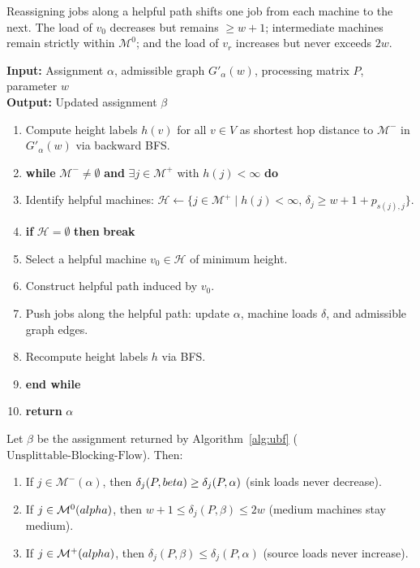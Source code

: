\documentclass{article}
\begin{document}
Reassigning jobs along a helpful path shifts one job from each machine to the next. The load of $v_0$ decreases but remains $\ge w+1$; intermediate machines remain strictly within $\mathcal{M}^0$; and the load of $v_r$ increases but never exceeds $2w$.

\begin{algorithm}[t]
\caption{Unsplittable-Blocking-Flow$(\alpha, G'_\alpha(w), P, w)$}
\label{alg:ubf}
\small
\textbf{Input:} Assignment $\alpha$, admissible graph $G'_\alpha(w)$, processing matrix $P$, parameter $w$\\
\textbf{Output:} Updated assignment $\beta$
\begin{enumerate}\setlength{\itemsep}{1pt}\setlength{\parskip}{0pt}
    \item Compute height labels $h(v)$ for all $v \in V$ as shortest hop distance to $\mathcal{M}^-$ in $G'_\alpha(w)$ via backward BFS.
    \item \textbf{while} $\mathcal{M}^- \neq \emptyset$ \textbf{and} $\exists j \in \mathcal{M}^+$ with $h(j) < \infty$ \textbf{do}
    \item \quad Identify helpful machines: $\mathcal{H} \leftarrow \{j \in \mathcal{M}^+ \mid h(j) < \infty, \, \delta_j \ge w + 1 + p_{s(j), j}\}$.
    \item \quad \textbf{if} $\mathcal{H} = \emptyset$ \textbf{then} \textbf{break}
    \item \quad Select a helpful machine $v_0 \in \mathcal{H}$ of minimum height.
    \item \quad Construct helpful path induced by $v_0$.
    \item \quad Push jobs along the helpful path: update $\alpha$, machine loads $\delta$, and admissible graph edges.
    \item \quad Recompute height labels $h$ via BFS.
    \item \textbf{end while}
    \item \textbf{return} $\alpha$
\end{enumerate}
\end{algorithm}

\begin{lemma}
\label{lem:load_invariance}
Let $\beta$ be the assignment returned by Algorithm~\ref{alg:ubf} ($\text{Unsplittable-Blocking-Flow}$). Then:
\begin{enumerate}
    \item If $j \in \mathcal{M}^-(\alpha)$, then $\delta_j(P, \\beta) \ge \delta_j(P, \alpha)$ (sink loads never decrease).
    \item If $j \in \mathcal{M}^0(\\alpha)$, then $w + 1 \le \delta_j(P, \beta) \le 2w$ (medium machines stay medium).
    \item If $j \in \mathcal{M}^+(\\alpha)$, then $\delta_j(P, \beta) \le \delta_j(P, \alpha)$ (source loads never increase).
\end{enumerate}
\end{lemma}
\end{document}
